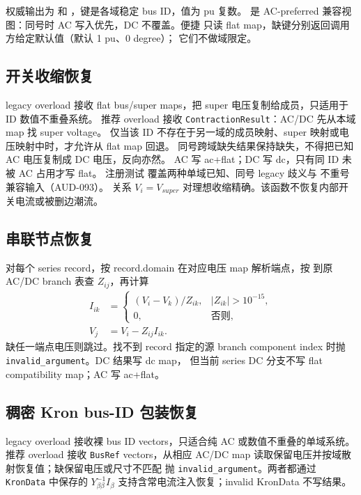 权威输出为  和 ，键是各域稳定 bus ID，值为 pu 复数。
 是 AC-preferred 兼容视图：同号时 AC 写入优先，DC 不覆盖。便捷
 只读 flat map，缺键分别返回调用方给定默认值（默认 1 pu、0 degree）；
它们不做域限定。

\subsection{开关收缩恢复}

legacy overload 接收 flat bus/super maps，把 super 电压复制给成员，只适用于 ID 数值不重叠系统。
推荐 overload 接收 \texttt{ContractionResult}：AC/DC 先从本域 map 找 super voltage。
仅当该 ID 不存在于另一域的成员映射、super 映射或电压映射中时，才允许从 flat map 回退。
同号跨域缺失结果保持缺失，不得把已知 AC 电压复制成 DC 电压，反向亦然。
AC 写 ac+flat；DC 写 dc，只有同 ID 未被 AC 占用才写 flat。
注册测试  覆盖两种单域已知、同号 legacy 歧义与
不重号兼容输入（AUD-093）。
关系 $V_i=V_{super}$ 对理想收缩精确。该函数不恢复内部开关电流或被删边潮流。

\subsection{串联节点恢复}

对每个 series record，按 record.domain 在对应电压 map 解析端点，按
 到原 AC/DC branch 表查 $Z_{ij}$，再计算
\begin{align}
I_{ik}&=\begin{cases}(V_i-V_k)/Z_{ik},&|Z_{ik}|>10^{-15},\\0,&\text{否则},\end{cases}\\
V_j&=V_i-Z_{ij}I_{ik}.
\end{align}
缺任一端点电压则跳过。找不到 record 指定的源 branch component index 时抛
\texttt{invalid\_argument}。DC 结果写 dc map，
但当前 series DC 分支不写 flat compatibility map；AC 写 ac+flat。

\subsection{稠密 Kron bus-ID 包装恢复}

legacy overload 接收裸 bus ID vectors，只适合纯 AC 或数值不重叠的单域系统。推荐 overload 接收
\texttt{BusRef} vectors，从相应 AC/DC map 读取保留电压并按域散射恢复值；缺保留电压或尺寸不匹配
抛 \texttt{invalid\_argument}。两者都通过 \texttt{KronData} 中保存的
$Y_{\beta\beta}^{-1}I_\beta$ 支持含常电流注入恢复；invalid KronData 不写结果。

